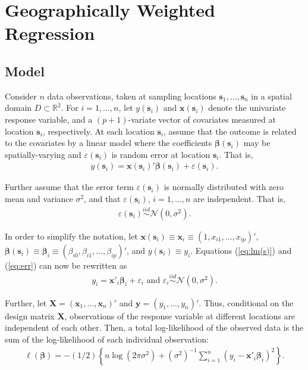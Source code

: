 \documentclass[authoryear, review, 11pt]{elsarticle}
\begin{document}
\section{Geographically Weighted Regression \label{section:GWR}}
	\subsection{Model}	
	Consider $n$ data observations, taken at sampling locations $\bm{s}_1, \dots, \bm{s}_n$ in a spatial domain $D \subset \mathbb{R}^2$. For $i = 1, \dots, n$, let $y(\bm{s}_i)$ and $\bm{x}(\bm{s}_i)$ denote the univariate response variable, and a $(p+1)$-variate vector of covariates measured at location $\bm{s}_i$, respectively. At each location $\bm{s}_i$, assume that the outcome is related to the covariates by a linear model where the coefficients $\bm{\beta}(\bm{s}_i)$ may be spatially-varying and $\varepsilon(\bm{s}_i)$ is random error at location $\bm{s}_i$. That is,
	\begin{align}\label{eq:lm(s)}
		y(\bm{s}_i) = \bm{x}(\bm{s}_i)' \bm{\beta}(\bm{s}_i) + \varepsilon(\bm{s}_i).
	\end{align}
	
	Further assume that the error term $\varepsilon(\bm{s}_i)$ is normally distributed with zero mean and variance $\sigma^2$, and that $\varepsilon(\bm{s}_i)$, $i=1, \dots, n$ are independent. That is,
	\begin{align} \label{eq:err}
		\varepsilon(\bm{s}_i) \overset{iid}{\sim} \mathcal{N} \left( 0,\sigma^2 \right).
	\end{align}
	
	In order to simplify the notation, let $\bm{x}(\bm{s}_i) \equiv \bm{x}_i \equiv \left( 1, x_{i1}, \dots, x_{ip} \right)'$, $\bm{\beta}(\bm{s}_i) \equiv \bm{\beta}_i \equiv \left(\beta_{i0}, \beta_{i1}, \dots, \beta_{ip} \right)'$, and $y(\bm{s}_i) \equiv y_i$.  Equations (\ref{eq:lm(s)}) and (\ref{eq:err}) can now be rewritten as
	\begin{align}
		y_i = \bm{x}'_i \bm{\beta}_i + \varepsilon_i \text{ and } \varepsilon_i \overset{iid}{\sim} \mathcal{N} \left( 0,\sigma^2 \right).
	\end{align}
	
	Further, let $\bm{X} = \left( \bm{x}_1, \dots, \bm{x}_n \right)'$ and $\bm{y} = \left( y_1, \dots, y_n \right)'$. Thus, conditional on the design matrix $\bm{X}$, observations of the response variable at different locations are independent of each other. Then, a total log-likelihood of the observed data is the sum of the log-likelihood of each individual observation:
	 \begin{align}
	 	\ell\left( \bm{\beta} \right) = - \left(1/2\right) \left\{ n \log \left( 2 \pi \sigma^2\right) +  \left(\sigma^{2}\right)^{-1}  \sum_{i=1}^n \left(y_i - \bm{x}'_i\bm{\beta}_i \right)^2  \right\}.
	\end{align}
	
\end{document}
